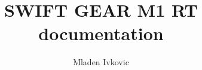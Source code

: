 



\newcommand{\deprecated}[1]{\textcolor{red}{NOTE: DEPRECATED \$\$ }\textcolor{gray}{\textit{#1}} \textcolor{red}{\$\$}}


\title{SWIFT GEAR M1 RT documentation}
\author{Mladen Ivkovic}
\date{}










\maketitle
\tableofcontents
\clearpage


















\appendix{}






